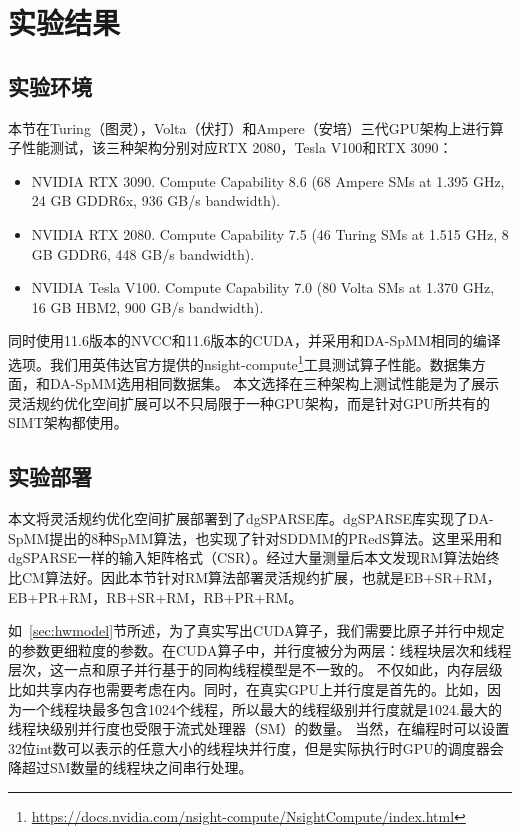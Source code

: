 \section{实验结果}
\subsection{实验环境}\label{sec:exp-env}
本节在Turing（图灵），Volta（伏打）和Ampere（安培）三代GPU架构上进行算子性能测试，该三种架构分别对应RTX 2080，Tesla V100和RTX 3090：
\begin{itemize}
\item NVIDIA RTX 3090. Compute Capability 8.6 (68 Ampere SMs at 1.395 GHz, 24 GB GDDR6x, 936 GB/s bandwidth).
\item NVIDIA RTX 2080. Compute Capability 7.5 (46 Turing SMs at
1.515 GHz, 8 GB GDDR6, 448 GB/s bandwidth).
\item NVIDIA Tesla V100. Compute Capability 7.0 (80 Volta SMs at
1.370 GHz, 16 GB HBM2, 900 GB/s bandwidth). 
\end{itemize}
同时使用11.6版本的NVCC和11.6版本的CUDA，并采用和DA-SpMM相同的编译选项。我们用英伟达官方提供的nsight-compute\footnote{\url{https://docs.nvidia.com/nsight-compute/NsightCompute/index.html}}工具测试算子性能。数据集方面，和DA-SpMM选用相同数据集。
本文选择在三种架构上测试性能是为了展示灵活规约优化空间扩展可以不只局限于一种GPU架构，而是针对GPU所共有的SIMT架构都使用。
\subsection{实验部署}\label{sec:exp}
本文将灵活规约优化空间扩展部署到了dgSPARSE库。dgSPARSE库实现了DA-SpMM提出的8种SpMM算法，也实现了针对SDDMM的PRedS算法。这里采用和dgSPARSE一样的输入矩阵格式（CSR）。经过大量测量后本文发现RM算法始终比CM算法好。因此本节针对RM算法部署灵活规约扩展，也就是EB+SR+RM，EB+PR+RM，RB+SR+RM，RB+PR+RM。

如~\ref{sec:hwmodel}节所述，为了真实写出CUDA算子，我们需要比原子并行中规定的参数更细粒度的参数。在CUDA算子中，并行度被分为两层：线程块层次和线程层次，这一点和原子并行基于的同构线程模型是不一致的。
不仅如此，内存层级比如共享内存也需要考虑在内。同时，在真实GPU上并行度是首先的。比如，因为一个线程块最多包含1024个线程，所以最大的线程级别并行度就是1024.最大的线程块级别并行度也受限于流式处理器（SM）的数量。
当然，在编程时可以设置32位int数可以表示的任意大小的线程块并行度，但是实际执行时GPU的调度器会降超过SM数量的线程块之间串行处理。

